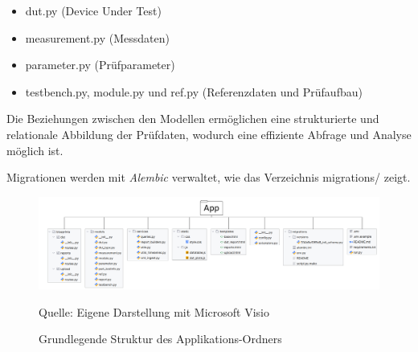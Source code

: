 \begin{itemize}

\item
dut.py (Device Under Test)

\item
measurement.py (Messdaten)

\item
parameter.py (Prüfparameter)

\item
testbench.py, module.py und ref.py (Referenzdaten und Prüfaufbau)

\end{itemize}

Die Beziehungen zwischen den Modellen ermöglichen eine strukturierte und relationale Abbildung der Prüfdaten, wodurch eine effiziente Abfrage und Analyse möglich ist.

Migrationen werden mit \textit{Alembic} verwaltet, wie das Verzeichnis migrations/ zeigt.


\begin{figure}[H]
    \centering
    \includegraphics[width=1\textwidth]{Grafiken/Min Ordnerstruktur Projekt}
    \caption{Grundlegende Struktur des Applikations-Ordners}
    \label{fig: Grundlegende Struktur des Applikations-Ordners}
    {Quelle: Eigene Darstellung mit Microsoft Visio}
\end{figure}








